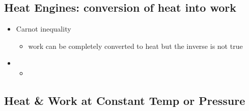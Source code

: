 \subsection*{Heat Engines: conversion of heat into work}
\begin{itemize}
	\item Carnot inequality
	      \begin{itemize}
		      \item work can be completely converted to heat but the inverse is not true
	      \end{itemize}
	\item
	      \begin{itemize}
		      \item
	      \end{itemize}
\end{itemize}

\subsection*{Heat \& Work at Constant Temp or Pressure }
